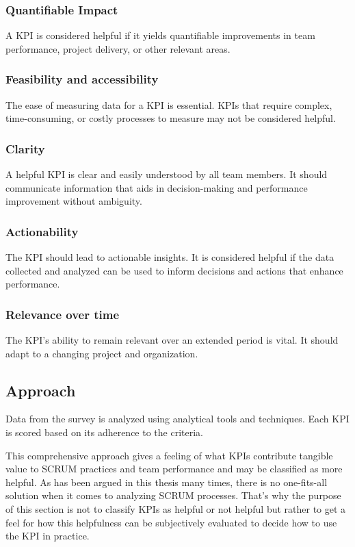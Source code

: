\subsubsection{Quantifiable Impact}

A KPI is considered helpful if it yields quantifiable improvements 
in team performance, project delivery, or other relevant areas.

\subsubsection{Feasibility and accessibility}
The ease of measuring data for a KPI is essential. 
KPIs that require complex, time-consuming, or costly processes 
to measure may not be considered helpful.

\subsubsection{Clarity}

A helpful KPI is clear and easily understood 
by all team members. 
It should communicate information that aids in 
decision-making and performance improvement without ambiguity.

\subsubsection{Actionability}
The KPI should lead to actionable insights. 
It is considered helpful if the data collected and 
analyzed can be used to inform decisions and actions 
that enhance performance.

\subsubsection{Relevance over time}
The KPI's ability to remain relevant over an extended period is vital. 
It should adapt to a changing project and organization.

\subsection{Approach}\label{approach-kpi-explore}

Data from the survey is analyzed using analytical tools and techniques. 
Each KPI is scored based on its adherence to the criteria.

This comprehensive approach gives a feeling of what 
KPIs contribute tangible value to SCRUM practices and 
team performance and may be classified as more helpful. 
As has been argued in this thesis many times, 
there is no one-fits-all solution when it comes to analyzing SCRUM processes. 
That's why the purpose of this section is not to classify 
KPIs as helpful or not helpful but rather to get a feel for how this 
helpfulness can be subjectively evaluated to 
decide how to use the KPI in practice. 

